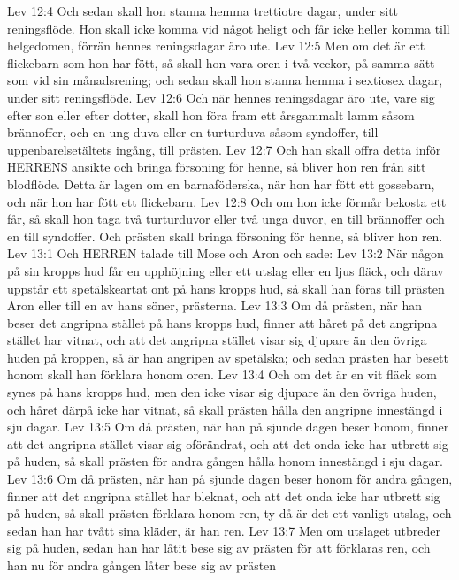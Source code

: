 Lev 12:4  Och sedan skall hon stanna hemma trettiotre dagar, under sitt reningsflöde. Hon skall icke komma vid något heligt och får icke heller komma till helgedomen, förrän hennes reningsdagar äro ute.
Lev 12:5  Men om det är ett flickebarn som hon har fött, så skall hon vara oren i två veckor, på samma sätt som vid sin månadsrening; och sedan skall hon stanna hemma i sextiosex dagar, under sitt reningsflöde.
Lev 12:6  Och när hennes reningsdagar äro ute, vare sig efter son eller efter dotter, skall hon föra fram ett årsgammalt lamm såsom brännoffer, och en ung duva eller en turturduva såsom syndoffer, till uppenbarelsetältets ingång, till prästen.
Lev 12:7  Och han skall offra detta inför HERRENS ansikte och bringa försoning för henne, så bliver hon ren från sitt blodflöde. Detta är lagen om en barnaföderska, när hon har fött ett gossebarn, och när hon har fött ett flickebarn.
Lev 12:8  Och om hon icke förmår bekosta ett får, så skall hon taga två turturduvor eller två unga duvor, en till brännoffer och en till syndoffer. Och prästen skall bringa försoning för henne, så bliver hon ren.
Lev 13:1  Och HERREN talade till Mose och Aron och sade:
Lev 13:2  När någon på sin kropps hud får en upphöjning eller ett utslag eller en ljus fläck, och därav uppstår ett spetälskeartat ont på hans kropps hud, så skall han föras till prästen Aron eller till en av hans söner, prästerna.
Lev 13:3  Om då prästen, när han beser det angripna stället på hans kropps hud, finner att håret på det angripna stället har vitnat, och att det angripna stället visar sig djupare än den övriga huden på kroppen, så är han angripen av spetälska; och sedan prästen har besett honom skall han förklara honom oren.
Lev 13:4  Och om det är en vit fläck som synes på hans kropps hud, men den icke visar sig djupare än den övriga huden, och håret därpå icke har vitnat, så skall prästen hålla den angripne innestängd i sju dagar.
Lev 13:5  Om då prästen, när han på sjunde dagen beser honom, finner att det angripna stället visar sig oförändrat, och att det onda icke har utbrett sig på huden, så skall prästen för andra gången hålla honom innestängd i sju dagar.
Lev 13:6  Om då prästen, när han på sjunde dagen beser honom för andra gången, finner att det angripna stället har bleknat, och att det onda icke har utbrett sig på huden, så skall prästen förklara honom ren, ty då är det ett vanligt utslag, och sedan han har tvått sina kläder, är han ren.
Lev 13:7  Men om utslaget utbreder sig på huden, sedan han har låtit bese sig av prästen för att förklaras ren, och han nu för andra gången låter bese sig av prästen
